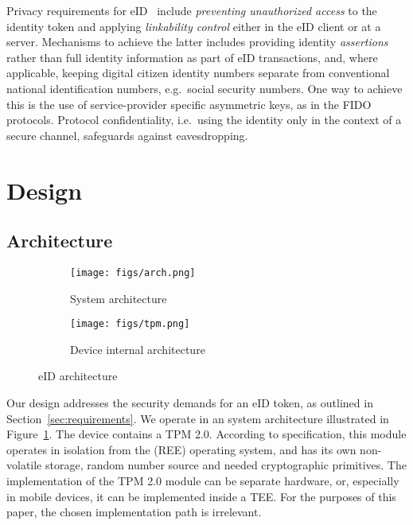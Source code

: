 \documentclass{sig-alternate-2013}
\begin{document}
Privacy requirements for eID~\cite{Naumann08} include \textit{preventing
unauthorized access} to the identity token and applying \textit{linkability
control} either in the eID client or at a server. Mechanisms to achieve the
latter includes providing identity \textit{assertions} rather than full identity
information as part of eID transactions, and, where applicable, keeping digital
citizen identity numbers separate from conventional national identification
numbers, e.g.\ social security numbers. One way to achieve this is the use of
service-provider specific asymmetric keys, as in the FIDO protocols. Protocol
confidentiality, i.e.\ using the identity only in the context of a secure
channel, safeguards against eavesdropping.


 
\section{Design}
\label{sec:design}

\subsection{Architecture}

\begin{figure*}
  \centering
  \begin{subfigure}{.5\textwidth}
    \centering
    \texttt{[image: figs/arch.png]}
    \caption{System architecture}
    \label{fig:system-architecture}
  \end{subfigure}\begin{subfigure}{.5\textwidth}
    \centering
    \texttt{[image: figs/tpm.png]}
    \caption{Device internal architecture}
    \label{fig:policy-components}
  \end{subfigure}
  \caption{eID architecture}
\end{figure*}

Our design addresses the security demands for an eID token, as outlined in
Section~\ref{sec:requirements}. We operate in an system architecture illustrated
in Figure~\ref{fig:system-architecture}. The device contains a TPM 2.0.
According to specification, this module operates in isolation from the (REE)
operating system, and has its own non-volatile storage, random number source and
needed cryptographic primitives. The implementation of the TPM 2.0 module can be
separate hardware, or, especially in mobile devices, it can be implemented
inside a TEE\@. For the purposes of this paper, the chosen implementation path
is irrelevant.
\end{document}
